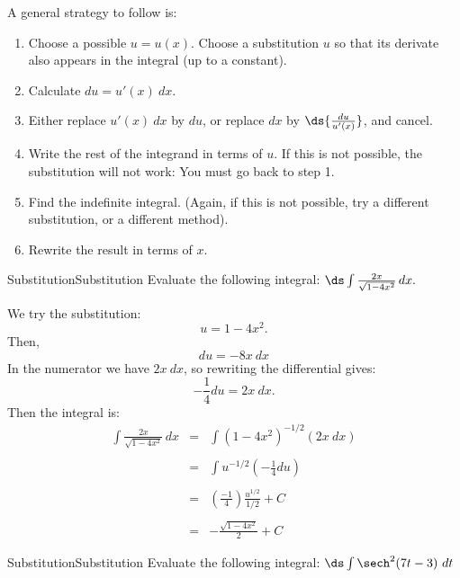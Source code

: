 \begin{formulabox}
A general strategy to follow is:
\begin{enumerate}\setlength{\itemsep}{0 in}
\item Choose a possible $u=u(x)$.  Choose a substitution $u$ so that its derivate also appears in the integral (up to a constant).
\item Calculate $du=u'(x)~dx$.
\item Either replace $u'(x)~dx$ by $du$, or replace $dx$ by $\ds{\frac{du}{u'(x)}}$, and cancel.
\item Write the rest of the integrand in terms of $u$. If this is not possible, the substitution will not work: You must go back to step 1.
\item Find the indefinite integral. (Again, if this is not possible, try a different substitution, or a different method).
\item Rewrite the result in terms of $x$.
\end{enumerate}
\end{formulabox}

\begin{example}{Substitution}{Substitution}
Evaluate the following integral: $\ds\int \frac{2x}{\sqrt{1-4x^2}}\,dx.$
\end{example}

\begin{solution} 
We try the substitution:
$$u=1-4x^2.$$
Then,
$$du=-8x~dx$$
In the numerator we have $2x~dx$, so rewriting the differential gives:
$$-\frac{1}{4}du=2x~dx.$$
Then the integral is:
\begin{eqnarray*}
\int \frac{2x}{\sqrt{1-4x^2}}\,dx&=&\int \left(1-4x^2\right)^{-1/2}(2x~dx)\\
\\
&=&\int u^{-1/2}\left(-\frac{1}{4}du\right)\\
\\
&=&\left(\frac{-1}{4}\right)\frac{u^{1/2}}{1/2}+C\\
\\
&=&-\frac{\sqrt{1-4x^2}}{2}+C
\end{eqnarray*}
\end{solution}



\begin{example}{Substitution}{Substitution}
Evaluate the following integral: $\ds\int \sech^2(7t-3)\ dt$
\end{example}

